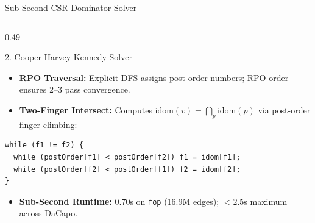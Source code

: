 \documentclass[11pt]{beamer}
\begin{document}
\begin{frame}[fragile]{Sub-Second CSR Dominator Solver}
\begin{columns}[T]
    \begin{column}{0.49\textwidth}
      \begin{block}{2. Cooper-Harvey-Kennedy Solver}
        \scriptsize
        \begin{itemize}\setlength{\itemsep}{1.5pt}
          \item \textbf{RPO Traversal:} Explicit DFS assigns post-order numbers; RPO order ensures 2--3 pass convergence.
          \item \textbf{Two-Finger Intersect:} Computes $\text{idom}(v) = \bigcap_{p} \text{idom}(p)$ via post-order finger climbing:
        \end{itemize}
        \vspace{-0.3em}
\begin{lstlisting}[style=javacodetiny, basicstyle=\fontsize{5.2pt}{6.2pt}\ttfamily]
while (f1 != f2) {
  while (postOrder[f1] < postOrder[f2]) f1 = idom[f1];
  while (postOrder[f2] < postOrder[f1]) f2 = idom[f2];
}
\end{lstlisting}
        \vspace{-0.6em}
        \begin{itemize}\setlength{\itemsep}{1.5pt}
          \item \textbf{Sub-Second Runtime:} 0.70s on \texttt{fop} (16.9M edges); $<2.5$s maximum across DaCapo.
        \end{itemize}
      \end{block}
    \end{column}
  \end{columns}
\end{frame}
\end{document}
